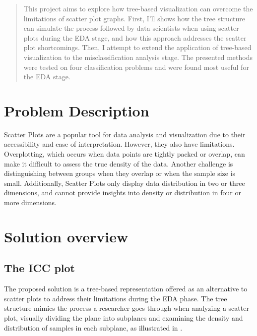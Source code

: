 \documentclass[11pt]{article}
\begin{document}
\maketitle

\begin{abstract}
This project aims to explore how tree-based visualization can overcome the limitations of scatter plot graphs. First, I'll shows how the tree structure can simulate the process followed by data scientists when using scatter plots during the EDA stage, and how this approach addresses the scatter plot shortcomings. Then, I attempt to extend the application of tree-based visualization to the misclassification analysis stage. The presented methods were tested on four classification problems and were found most useful for the EDA stage.

\end{abstract}

\section{Problem Description}\label{Problem Description}
Scatter Plots are a popular tool for data analysis and visualization due to their accessibility and ease of interpretation. However, they also have limitations. Overplotting, which occurs when data points are tightly packed or overlap, can make it difficult to assess the true density of the data. Another challenge is distinguishing between groups when they overlap or when the sample size is small. Additionally, Scatter Plots only display data distribution in two or three dimensions, and cannot provide insights into density or distribution in four or more dimensions.

\section{Solution overview}\label{Solution overview}
\subsection{The ICC plot}\label{The ICC plot}
The proposed solution is a tree-based representation offered as an alternative to scatter plots to address their limitations during the EDA phase. The tree structure mimics the process a researcher goes through when analyzing a scatter plot, visually dividing the plane into subplanes and examining the density and distribution of samples in each subplane, as illustrated in .
\end{document}
